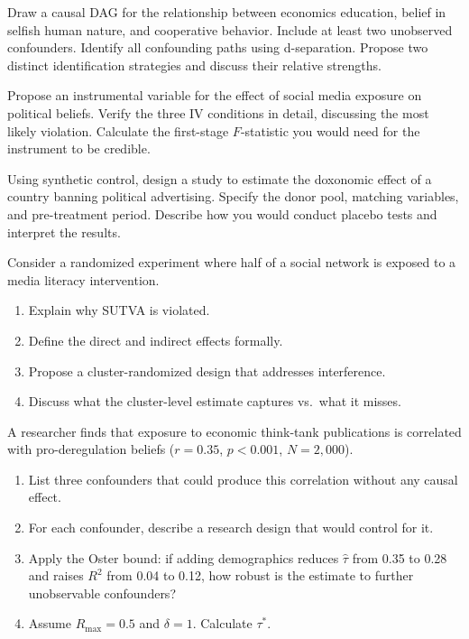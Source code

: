 \begin{exercise}
Draw a causal DAG for the relationship between economics education, belief in selfish human nature, and cooperative behavior.
Include at least two unobserved confounders.
Identify all confounding paths using d-separation.
Propose two distinct identification strategies and discuss their relative strengths.
\end{exercise}

\begin{exercise}
Propose an instrumental variable for the effect of social media exposure on political beliefs.
Verify the three IV conditions in detail, discussing the most likely violation.
Calculate the first-stage $F$-statistic you would need for the instrument to be credible.
\end{exercise}

\begin{exercise}
Using synthetic control, design a study to estimate the doxonomic effect of a country banning political advertising.
Specify the donor pool, matching variables, and pre-treatment period.
Describe how you would conduct placebo tests and interpret the results.
\end{exercise}

\begin{exercise}
\label{ex:interference}
Consider a randomized experiment where half of a social network is exposed to a media literacy intervention.
\begin{enumerate}[nosep]
  \item Explain why SUTVA is violated.
  \item Define the direct and indirect effects formally.
  \item Propose a cluster-randomized design that addresses interference.
  \item Discuss what the cluster-level estimate captures vs.\ what it misses.
\end{enumerate}
\end{exercise}

\begin{exercise}
A researcher finds that exposure to economic think-tank publications is correlated with pro-deregulation beliefs ($r = 0.35$, $p < 0.001$, $N = 2{,}000$).
\begin{enumerate}[nosep]
  \item List three confounders that could produce this correlation without any causal effect.
  \item For each confounder, describe a research design that would control for it.
  \item Apply the Oster bound: if adding demographics reduces $\hat{\tau}$ from 0.35 to 0.28 and raises $R^2$ from 0.04 to 0.12, how robust is the estimate to further unobservable confounders?
  \item Assume $R_{\max} = 0.5$ and $\delta = 1$. Calculate $\tau^*$.
\end{enumerate}
\end{exercise}

